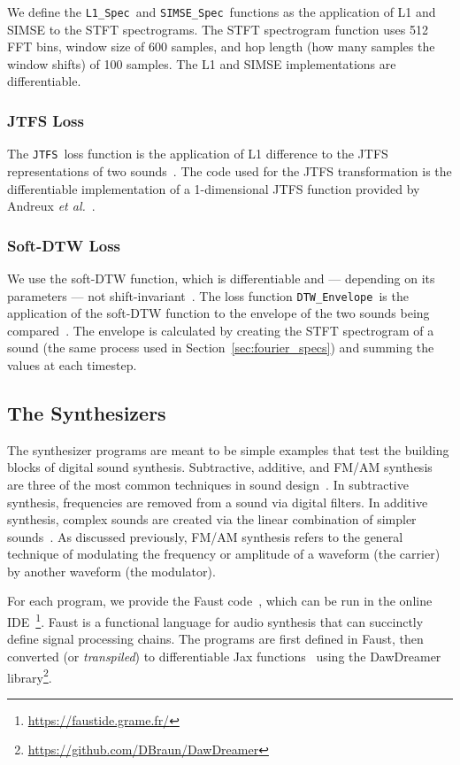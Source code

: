 \documentclass[lettersize,journal]{IEEEtran}
\newcommand{\SIMSESpec}{\texttt{SIMSE\_Spec}}
\newcommand{\LoneSpec}{\texttt{L1\_Spec}}
\newcommand{\JTFS}{\texttt{JTFS}}
\newcommand{\DTWEnv}{\texttt{DTW\_Envelope}}
\begin{document}
We define the \LoneSpec~and \SIMSESpec~functions as the application of L1 and SIMSE to the STFT spectrograms. The STFT spectrogram function uses 512 FFT bins, window size of 600 samples, and hop length (how many samples the window shifts) of 100 samples. The L1 and SIMSE implementations are differentiable. 

\subsubsection{JTFS Loss}
The \JTFS~loss function is the application of L1 difference to the JTFS representations of two sounds~\cite{vahidi2023mesostructures}. The code used for the JTFS transformation is the differentiable implementation of a 1-dimensional JTFS function provided by Andreux \textit{et al.}~\cite{kymatio}.

\subsubsection{Soft-DTW Loss}
We use the soft-DTW function, which is differentiable and --- depending on its parameters --- not shift-invariant~\cite{cuturi2017soft,janati2020spatio,tavenard.blog.softdtw}. The loss function \DTWEnv~is the application of the soft-DTW function to the envelope of the two sounds being compared~\cite{lyons1997understanding}. The envelope is calculated by creating the STFT spectrogram of a sound (the same process used in Section~\ref{sec:fourier_specs}) and summing the values at each timestep. 

\subsection{The Synthesizers}
\label{sec:programs}
The synthesizer programs are meant to be simple examples that test the building blocks of digital sound synthesis. Subtractive, additive, and FM/AM synthesis are three of the most common techniques in sound design~\cite{smith1991viewpoints}. In subtractive synthesis, frequencies are removed from a sound via digital filters. In additive synthesis, complex sounds are created via the linear combination of simpler sounds~\cite{lyons1997understanding,smith2007introduction}. As discussed previously, FM/AM synthesis refers to the general technique of modulating the frequency or amplitude of a waveform (the carrier) by another waveform (the modulator).

For each program, we provide the Faust code~\cite{orlarey2009faust}, which can be run in the online IDE~\footnote{\url{https://faustide.grame.fr/}}. Faust is a functional language for audio synthesis that can succinctly define signal processing chains. The programs are first defined in Faust, then converted (or \textit{transpiled}) to differentiable Jax functions~\cite{braun2024dac} using the DawDreamer library\footnote{\url{https://github.com/DBraun/DawDreamer}}. 
\end{document}
